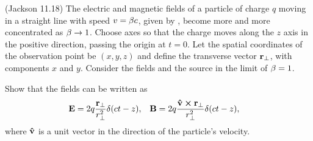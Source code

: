 \newcommand{\vr}{\vb{r}}
\newcommand{\vrperp}{\vr_\perp}

\begin{statement}{(Jackson 11.18)}
	The electric and magnetic fields of a particle of charge $q$ moving in a straight line with speed $v = \beta c$, given by , become more and more concentrated as $\beta \to 1$.  Choose axes so that the charge moves along the $z$ axis in the positive direction, passing the origin at $t = 0$.  Let the spatial coordinates of the observation point be $(x, y, z)$ and define the transverse vector $\vrperp$, with components $x$ and $y$.  Consider the fields and the source in the limit of $\beta = 1$.
\end{statement}

\newcommand{\rperp}{r_\perp}
\newcommand{\vE}{\vb{E}}
\newcommand{\vB}{\vb{B}}
\newcommand{\vh}{\vb{\hat{v}}}
\newcommand{\delctz}{\del(ct - z)}

\begin{problem} \label{3.a}
	Show that the fields can be written as
	\begin{align} \label{show3.a}
		\vE &= 2q \frac{\vrperp}{\rperp^2} \delctz, &
		\vB &= 2q \frac{\vh \cross \vrperp}{\rperp^2} \delctz,
	\end{align}
	where $\vh$ is a unit vector in the direction of the particle's velocity.
\end{problem}


\newcommand{\xh}{\vb{\hat{x}}}
\newcommand{\yh}{\vb{\hat{y}}}
\newcommand{\zh}{\vb{\hat{z}}}
\newcommand{\intii}{\int_{-\infty}^\infty}
\newcommand{\limgam}{\lim_{\gam \to \infty}}
\newcommand{\du}{\dd{u}}
\newcommand{\dz}{\dd{z}}
\newcommand{\vEperp}{\vE_\perp}
\newcommand{\tif}{\text{if }}


